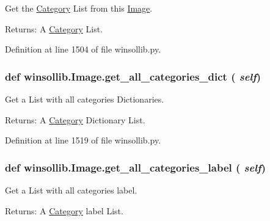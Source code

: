 Get the \hyperlink{classwinsollib_1_1Category}{Category} List from this \hyperlink{classwinsollib_1_1Image}{Image}. 

\begin{Desc}
\item[Returns:]A \hyperlink{classwinsollib_1_1Category}{Category} List. \end{Desc}


Definition at line 1504 of file winsollib.py.\hypertarget{classwinsollib_1_1Image_5e6a3c2026c6b95c06295d7ead468821}{
\subsubsection[get\_\-all\_\-categories\_\-dict]{\setlength{\rightskip}{0pt plus 5cm}def winsollib.Image.get\_\-all\_\-categories\_\-dict ( {\em self})}}
\label{classwinsollib_1_1Image_5e6a3c2026c6b95c06295d7ead468821}


Get a List with all categories Dictionaries. 

\begin{Desc}
\item[Returns:]A \hyperlink{classwinsollib_1_1Category}{Category} Dictionary List. \end{Desc}


Definition at line 1519 of file winsollib.py.\hypertarget{classwinsollib_1_1Image_785563288902ba88aa4d14109b32c967}{
\subsubsection[get\_\-all\_\-categories\_\-label]{\setlength{\rightskip}{0pt plus 5cm}def winsollib.Image.get\_\-all\_\-categories\_\-label ( {\em self})}}
\label{classwinsollib_1_1Image_785563288902ba88aa4d14109b32c967}


Get a List with all categories label. 

\begin{Desc}
\item[Returns:]A \hyperlink{classwinsollib_1_1Category}{Category} label List. \end{Desc}


